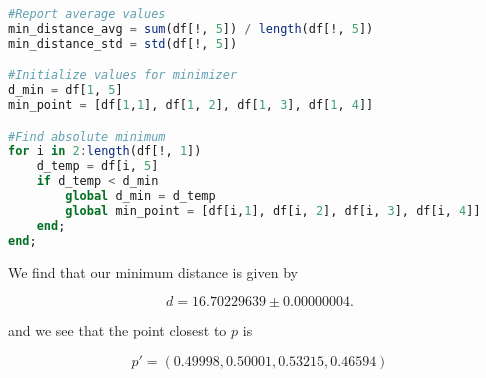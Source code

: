 \documentclass{article}
\newcommand{\be}{\begin{equation}}
\newcommand{\ee}{\end{equation}}
\begin{document}
\begin{lstlisting}[language = julia]
#Report average values 
min_distance_avg = sum(df[!, 5]) / length(df[!, 5])
min_distance_std = std(df[!, 5])

#Initialize values for minimizer
d_min = df[1, 5]
min_point = [df[1,1], df[1, 2], df[1, 3], df[1, 4]]

#Find absolute minimum
for i in 2:length(df[!, 1])
    d_temp = df[i, 5]
    if d_temp < d_min
        global d_min = d_temp
        global min_point = [df[i,1], df[i, 2], df[i, 3], df[i, 4]]
    end;
end;
\end{lstlisting}

We find that our minimum distance is given by 

\be
	d = 16.70229639 \pm 0.00000004. 
\ee

and we see that the point closest to $p$ is

\be
\boxed{p' = (0.49998, 0.50001, 0.53215, 0.46594)}
\ee
\end{document}
